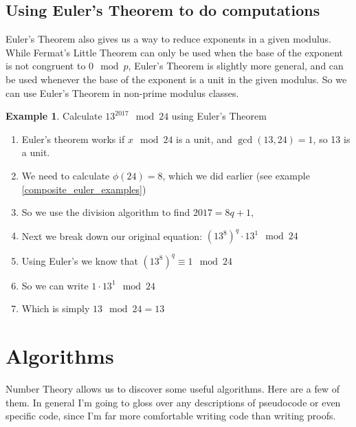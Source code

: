 \documentclass[10pt]{article}
\theoremstyle{definition}
\newtheorem{ex}[theorem]{Example}
\theoremstyle{remark}
\begin{document}
\subsection{Using Euler's Theorem to do computations}
Euler's Theorem also gives us a way to reduce exponents in a given modulus.  While Fermat's Little Theorem can only be used when the base of the exponent is not congruent to $0 \mod p$, Euler's Theorem is slightly more general, and can be used whenever the base of the exponent is a unit in the given modulus.  So we can use Euler's Theorem in non-prime modulus classes.
\begin{ex}
Calculate $13^{2017} \mod 24$ using Euler's Theorem
\begin{enumerate}
\item Euler's theorem works if $x \mod 24$ is a unit, and $\gcd(13,24) = 1$, so 13 is a unit.
\item We need to calculate $\phi(24) = 8$, which we did earlier (see example \ref{composite_euler_examples})
\item So we use the division algorithm to find $2017 = 8q + 1$, 
\item Next we break down our original equation: $(13^{8})^q \cdot 13^1 \mod 24$
\item Using Euler's we know that $(13^{8})^q \equiv 1 \mod 24 $
\item So we can write $1 \cdot 13^1 \mod 24$
\item Which is simply $13 \mod 24 = 13$
\end{enumerate}
\end{ex}

\section{Algorithms}
Number Theory allows us to discover some useful algorithms.  Here are a few of them.  In general I'm going to gloss over any descriptions of pseudocode or even specific code, since I'm far more comfortable writing code than writing proofs.
\end{document}
